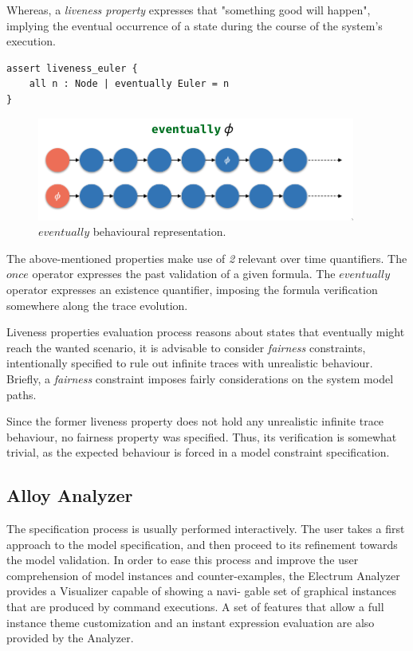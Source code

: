 Whereas, a \textit{liveness property} expresses that "something good will happen", implying the eventual occurrence of a state during the course of the system's execution. \cite{lamport1977proving}

\begin{lstlisting}[title={\textit{Liveness Property}: Eventually every node will be visited.}, otherkeywords = {eventually, always, assert, all, \:, module, set, fact, iden, no, in, \=, \*, \+, \~, \-\>, \&}, floatplacement=H, label={liveness}]
assert liveness_euler {
    all n : Node | eventually Euler = n
} 
\end{lstlisting}

\begin{figure}[H]
    \centering
    \includegraphics[width=0.6\linewidth]{images/alloy_eventually.png}
    \caption{$eventually$ behavioural representation.}
    \label{fig:alloy-eventually}
\end{figure}

The above-mentioned properties make use of \textit{2} relevant over time quantifiers. The $once$ operator expresses the past validation of a given formula. The $eventually$ operator expresses an existence quantifier, imposing the formula verification somewhere along the trace evolution. \cite{alloy-docs} 

Liveness properties evaluation process reasons about states that eventually might reach the wanted scenario, it is advisable to consider \textit{fairness} constraints, intentionally specified to rule out infinite traces with unrealistic behaviour. \cite{baier2008principles} Briefly, a \textit{fairness} constraint imposes fairly considerations on the system model paths. \cite{wahlfairness} 

Since the former liveness property does not hold any unrealistic infinite trace behaviour, no fairness property was specified. Thus, its verification is somewhat trivial, as the expected behaviour is forced in a model constraint specification.


\subsection{Alloy Analyzer}

The specification process is usually performed interactively. The user takes a first approach to the model specification, and then proceed to its refinement towards the model validation. In order to ease this process and improve the user comprehension of model instances and counter-examples, the Electrum Analyzer provides a Visualizer capable of showing a navi- gable set of graphical instances that are produced by command executions. A set of features that allow a full instance theme customization and an instant expression evaluation are also provided by the Analyzer.

